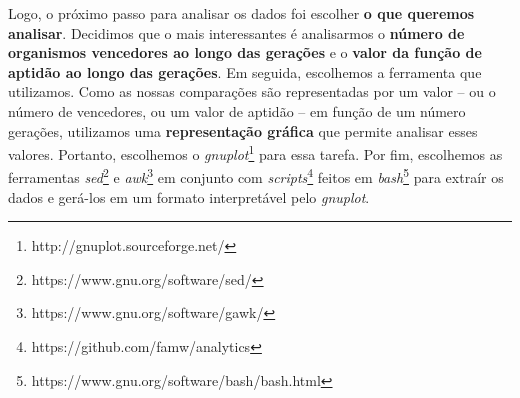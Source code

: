 Logo, o próximo passo para analisar os dados foi escolher \textbf{o que
queremos analisar}. Decidimos que o mais interessantes é analisarmos o
\textbf{número de organismos vencedores ao longo das gerações} e o
\textbf{valor da função de aptidão ao longo das gerações}. Em seguida,
escolhemos a ferramenta que utilizamos. Como as nossas comparações são
representadas por um valor -- ou o número de vencedores, ou um valor de aptidão
-- em função de um número gerações, utilizamos uma \textbf{representação
gráfica} que permite analisar esses valores. Portanto, escolhemos o
\textit{gnuplot}\footnote{http://gnuplot.sourceforge.net/} para essa tarefa.
Por fim, escolhemos as ferramentas
\textit{sed}\footnote{https://www.gnu.org/software/sed/} e
\textit{awk}\footnote{https://www.gnu.org/software/gawk/} em conjunto com
\textit{scripts}\footnote{https://github.com/famw/analytics} feitos em
\textit{bash}\footnote{https://www.gnu.org/software/bash/bash.html} para
extraír os dados e gerá-los em um formato interpretável pelo \textit{gnuplot}.
